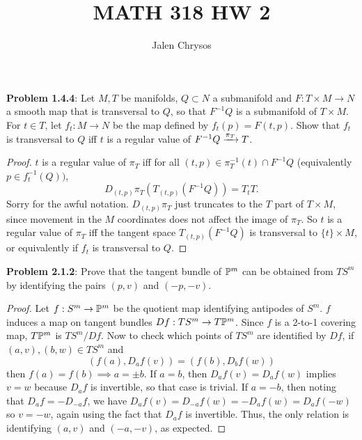\documentclass{amsart}
\title{MATH 318 HW 2}
\author{Jalen Chrysos}
\begin{document}
	\maketitle
	\textbf{Problem 1.4.4}: Let $M,T$ be manifolds, $Q\subset N$ a submanifold and $F:T\times M\to N$ a smooth map that is transversal to $Q$, so that $F^{-1}Q$ is a submanifold of $T\times M$. For $t\in T$, let $f_t:M\to N$ be the map defined by $f_t(p)=F(t,p)$. Show that $f_t$ is transversal to $Q$ iff $t$ is a regular value of $F^{-1}Q\xra{\pi_T}T$.
	\begin{proof}
		$t$ is a regular value of $\pi_T$ iff for all $(t,p)\in \pi_T^{-1}(t)\cap F^{-1}Q$ (equivalently $p\in f_t^{-1}(Q))$, 
		$$D_{(t,p)}\pi_T(T_{(t,p)}(F^{-1}Q)) = T_tT.$$
		Sorry for the awful notation. $D_{(t,p)}\pi_T$ just truncates to the $T$ part of $T\times M$, since movement in the $M$ coordinates does not affect the image of $\pi_T$. So $t$ is a regular value of $\pi_T$ iff the tangent space $T_{(t,p)}(F^{-1}Q)$ is transversal to $\{t\}\times M$, or equivalently if $f_t$ is transversal to $Q$.
	\end{proof}
	\newpage
	
	\textbf{Problem 2.1.2}: Prove that the tangent bundle of $\P^m$ can be obtained from $TS^m$ by identifying the pairs $(p,v)$ and $(-p,-v)$.
	\begin{proof}
		Let $f:S^m\to \P^m$ be the quotient map identifying antipodes of $S^m$. $f$ induces a map on tangent bundles $Df: TS^m\to T\P^m$. Since $f$ is a 2-to-1 covering map, $T\P^m$ is $TS^m/Df$. Now to check which points of $TS^m$ are identified by $Df$, if $(a,v),(b,w)\in TS^m$ and 
		$$
		(f(a),D_af(v)) = (f(b),D_bf(w)) 
		$$
		then $f(a)=f(b)\implies a = \pm b$. If $a=b$, then $D_af(v)=D_af(w)$ implies $v=w$ because $D_af$ is invertible, so that case is trivial. If $a=-b$, then noting that $D_af=-D_{-a}f$, we have $D_af(v)=D_{-a}f(w)=-D_af(w)=D_af(-w)$ so $v=-w$, again using the fact that $D_af$ is invertible. Thus, the only relation is identifying $(a,v)$ and $(-a,-v)$, as expected. 
	\end{proof}
	\newpage
	
\end{document}
